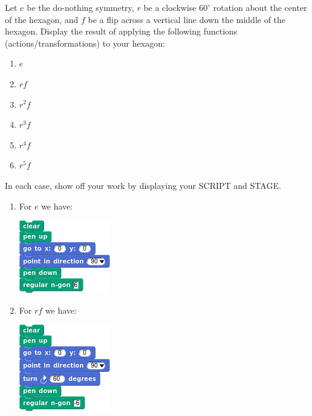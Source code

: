 \documentclass[noauthor,nooutcomes,12pt,hints,handout]{ximera}
\begin{document}
\begin{question}
  Let $e$ be the do-nothing symmetry, $r$ be a clockwise $60^\circ$
  rotation about the center of the hexagon, and $f$ be a flip across a
  vertical line down the middle of the hexagon. Display the result of
  applying the following functions (actions/transformations) to your
  hexagon:
  \begin{enumerate}
  \item $e$
  \item $rf$
  \item $r^2 f$
  \item $r^3 f$
  \item $r^4 f$
  \item $r^5 f$
  \end{enumerate}
  In each case, show off your work by displaying your SCRIPT and
  STAGE.
  \begin{freeResponse}
    \begin{enumerate}
    \item For $e$ we have:
      \begin{center}
        \includegraphics[width=.3\textwidth]{eHexSCRIPT.png}   \qquad {}
      \end{center}
    \item For $rf$ we have:
      \begin{center}
        \includegraphics[width=.3\textwidth]{rfHexSCRIPT.png}   \qquad {}

\end{center}
\end{enumerate}
\end{freeResponse}
\end{question}
\end{document}
